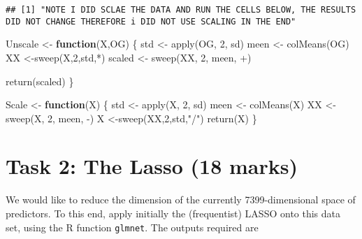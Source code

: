 \documentclass[
]{article}
\newenvironment{Shaded}{\begin{snugshade}}{\end{snugshade}}
\newcommand{\AttributeTok}[1]{\textcolor[rgb]{0.77,0.63,0.00}{#1}}
\newcommand{\ControlFlowTok}[1]{\textcolor[rgb]{0.13,0.29,0.53}{\textbf{#1}}}
\newcommand{\DecValTok}[1]{\textcolor[rgb]{0.00,0.00,0.81}{#1}}
\newcommand{\FunctionTok}[1]{\textcolor[rgb]{0.00,0.00,0.00}{#1}}
\newcommand{\NormalTok}[1]{#1}
\newcommand{\OtherTok}[1]{\textcolor[rgb]{0.56,0.35,0.01}{#1}}
\newcommand{\StringTok}[1]{\textcolor[rgb]{0.31,0.60,0.02}{#1}}
\begin{document}
\begin{verbatim}
## [1] "NOTE I DID SCLAE THE DATA AND RUN THE CELLS BELOW, THE RESULTS DID NOT CHANGE THEREFORE i DID NOT USE SCALING IN THE END"
\end{verbatim}

\begin{Shaded}
\begin{Highlighting}[]
\NormalTok{Unscale }\OtherTok{\textless{}{-}} \ControlFlowTok{function}\NormalTok{(X,OG) \{}
\NormalTok{  std }\OtherTok{\textless{}{-}} \FunctionTok{apply}\NormalTok{(OG, }\DecValTok{2}\NormalTok{, sd)}
\NormalTok{  meen }\OtherTok{\textless{}{-}} \FunctionTok{colMeans}\NormalTok{(OG)}
\NormalTok{  XX }\OtherTok{\textless{}{-}}\FunctionTok{sweep}\NormalTok{(X,}\DecValTok{2}\NormalTok{,std,}\StringTok{\textasciigrave{}}\AttributeTok{*}\StringTok{\textasciigrave{}}\NormalTok{)}
\NormalTok{  scaled }\OtherTok{\textless{}{-}} \FunctionTok{sweep}\NormalTok{(XX, }\DecValTok{2}\NormalTok{, meen, }\StringTok{\textasciigrave{}}\AttributeTok{+}\StringTok{\textasciigrave{}}\NormalTok{)}
  
  \FunctionTok{return}\NormalTok{(scaled)}
\NormalTok{\}}

\NormalTok{Scale }\OtherTok{\textless{}{-}} \ControlFlowTok{function}\NormalTok{(X) \{}
\NormalTok{  std }\OtherTok{\textless{}{-}} \FunctionTok{apply}\NormalTok{(X, }\DecValTok{2}\NormalTok{, sd)}
\NormalTok{  meen }\OtherTok{\textless{}{-}} \FunctionTok{colMeans}\NormalTok{(X)}
\NormalTok{  XX }\OtherTok{\textless{}{-}} \FunctionTok{sweep}\NormalTok{(X, }\DecValTok{2}\NormalTok{, meen, }\StringTok{\textasciigrave{}}\AttributeTok{{-}}\StringTok{\textasciigrave{}}\NormalTok{)}
\NormalTok{  X }\OtherTok{\textless{}{-}}\FunctionTok{sweep}\NormalTok{(XX,}\DecValTok{2}\NormalTok{,std,}\StringTok{"/"}\NormalTok{)}
  \FunctionTok{return}\NormalTok{(X)}
\NormalTok{\}}
\end{Highlighting}
\end{Shaded}

\hypertarget{task-2-the-lasso-18-marks}{%
\section{Task 2: The Lasso (18 marks)}\label{task-2-the-lasso-18-marks}}

We would like to reduce the dimension of the currently 7399-dimensional
space of predictors. To this end, apply initially the (frequentist)
LASSO onto this data set, using the R function \texttt{glmnet}. The
outputs required are
\end{document}
